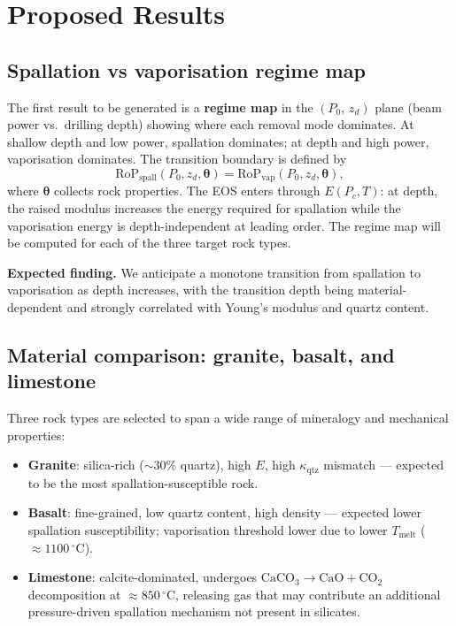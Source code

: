 \documentclass[12pt, a4paper]{article}
\newcommand{\vv}[1]{\bm{#1}}
\begin{document}
\section{Proposed Results}
\label{sec:results}

\subsection{Spallation vs vaporisation regime map}

The first result to be generated is a \textbf{regime map} in the
$(P_0,\, z_d)$ plane (beam power vs.\ drilling depth) showing where each removal
mode dominates.  At shallow depth and low power, spallation dominates; at depth
and high power, vaporisation dominates.  The transition boundary is defined by
\begin{equation}
    \mathrm{RoP}_\mathrm{spall}(P_0, z_d, \vv{\theta}) =
    \mathrm{RoP}_\mathrm{vap}(P_0, z_d, \vv{\theta}),
    \label{eq:transition}
\end{equation}
where $\vv{\theta}$ collects rock properties.  The EOS enters through
$E(P_c, T)$: at depth, the raised modulus increases the energy required for
spallation while the vaporisation energy is depth-independent at leading order.
The regime map will be computed for each of the three target rock types.

\textbf{Expected finding.}  We anticipate a monotone transition from spallation
to vaporisation as depth increases, with the transition depth being
material-dependent and strongly correlated with Young's modulus and quartz
content.

\subsection{Material comparison: granite, basalt, and limestone}

Three rock types are selected to span a wide range of mineralogy and mechanical
properties:

\begin{itemize}[noitemsep]
    \item \textbf{Granite}: silica-rich ($\sim 30\%$ quartz), high $E$, high
    $\kappa_\mathrm{qtz}$ mismatch — expected to be the most
    spallation-susceptible rock.
    \item \textbf{Basalt}: fine-grained, low quartz content, high density —
    expected lower spallation susceptibility; vaporisation threshold lower due
    to lower $T_\mathrm{melt}$ ($\approx 1100\,^\circ\mathrm{C}$).
    \item \textbf{Limestone}: calcite-dominated, undergoes $\mathrm{CaCO_3}
    \to \mathrm{CaO} + \mathrm{CO_2}$ decomposition at $\approx 850\,^\circ
    \mathrm{C}$, releasing gas that may contribute an additional pressure-driven
    spallation mechanism not present in silicates.
\end{itemize}
\end{document}
